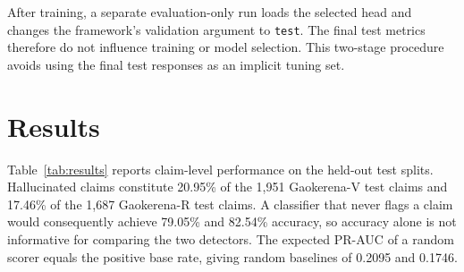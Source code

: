\documentclass[conference]{IEEEtran}
\begin{document}
After training, a separate evaluation-only run loads the selected head and changes the framework's validation argument to \texttt{test}. The final test metrics therefore do not influence training or model selection. This two-stage procedure avoids using the final test responses as an implicit tuning set.

\section{Results}

Table~\ref{tab:results} reports claim-level performance on the held-out test splits. Hallucinated claims constitute 20.95\% of the 1,951 Gaokerena-V test claims and 17.46\% of the 1,687 Gaokerena-R test claims. A classifier that never flags a claim would consequently achieve 79.05\% and 82.54\% accuracy, so accuracy alone is not informative for comparing the two detectors. The expected PR-AUC of a random scorer equals the positive base rate, giving random baselines of 0.2095 and 0.1746.

\begin{table}[ht]

\centering

\small

\caption{Claim-level uncertainty-head performance on the held-out test splits (\%).}

\label{tab:results}


\end{table}
\end{document}

